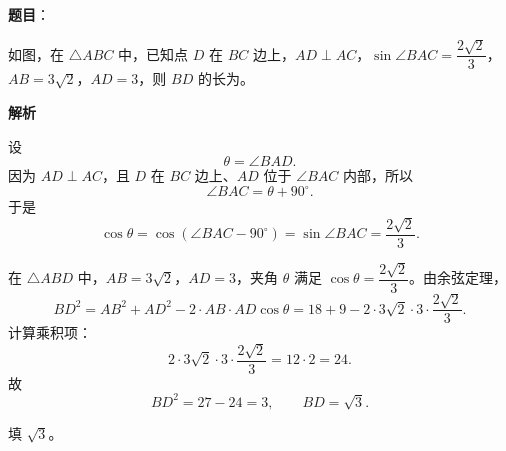 \begin{answer}

\textbf{题目}：

如图，在 $\triangle ABC$ 中，已知点 $D$ 在 $BC$ 边上，$AD\perp AC$，$\sin\angle BAC=\dfrac{2\sqrt2}{3}$，$AB=3\sqrt2$，$AD=3$，则 $BD$ 的长为\gkblank{}。
\nopagebreak[4]
\begin{center}\end{center}
\nopagebreak[4]
\textbf{解析}

设
\nopagebreak[4]
\[\theta=\angle BAD.\]
因为 $AD\perp AC$，且 $D$ 在 $BC$ 边上、$AD$ 位于 $\angle BAC$ 内部，所以
\nopagebreak[4]
\[\angle BAC=\theta+90^\circ.\]
于是
\nopagebreak[4]
\[\cos\theta=\cos\left(\angle BAC-90^\circ\right)=\sin\angle BAC=\frac{2\sqrt2}{3}.\]

在 $\triangle ABD$ 中，$AB=3\sqrt2$，$AD=3$，夹角 $\theta$ 满足 $\cos\theta=\dfrac{2\sqrt2}{3}$。由余弦定理，
\nopagebreak[4]
\[BD^2=AB^2+AD^2-2\cdot AB\cdot AD\cos\theta
=18+9-2\cdot3\sqrt2\cdot3\cdot\frac{2\sqrt2}{3}.\]
计算乘积项：
\nopagebreak[4]
\[2\cdot3\sqrt2\cdot3\cdot\frac{2\sqrt2}{3}=12\cdot2=24.\]
故
\nopagebreak[4]
\[BD^2=27-24=3,\qquad BD=\sqrt3.\]

填 $\sqrt3$。


\end{answer}
